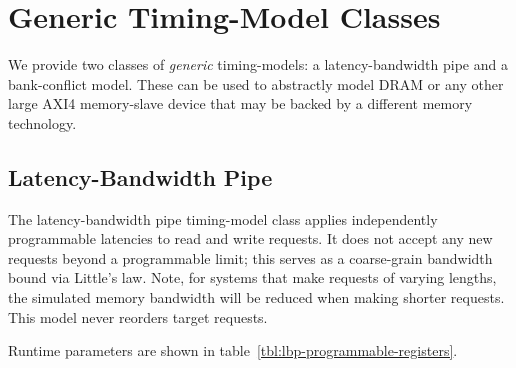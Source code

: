 \section{Generic Timing-Model Classes}

We provide two classes of \emph{generic} timing-models: a latency-bandwidth
pipe and a bank-conflict model. These can be used to abstractly model DRAM or
any other large AXI4 memory-slave device that may be backed by a different
memory technology.

\subsection{Latency-Bandwidth Pipe}

The latency-bandwidth pipe timing-model class applies independently
programmable latencies to read and write requests. It does not accept any new
requests beyond a programmable limit; this serves as a coarse-grain bandwidth
bound via Little's law. Note, for systems that make requests of varying
lengths, the simulated memory bandwidth will be reduced when making shorter
requests. This model never reorders target requests.

\noindent Runtime parameters are shown in table~\ref{tbl:lbp-programmable-registers}.

\begin{table}
\begin{center}
\end{center}
\caption{Programmable registers of the latency-bandwidth pipe.}
\label{tbl:lbp-programmable-registers}
\end{table}%

